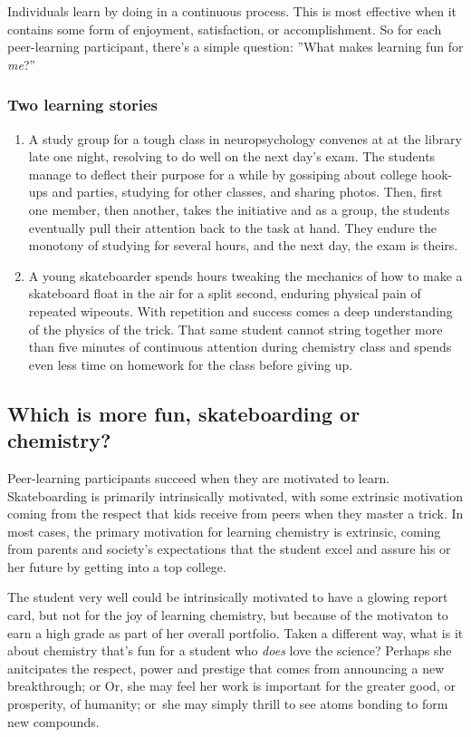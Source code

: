 Individuals learn by doing in a continuous process. This is most
effective when it contains some form of enjoyment, satisfaction, or
accomplishment. So for each peer-learning participant, there's a simple
question: ''What makes learning fun for \emph{me}?''

\subsubsection{Two learning stories}

\begin{enumerate}
\item
  A study group for a tough class in neuropsychology convenes at at the
  library late one night, resolving to do well on the next day's exam.
  The students manage to deflect their purpose for a while by gossiping
  about college hook-ups and parties, studying for other classes, and
  sharing photos. Then, first one member, then another, takes the
  initiative and as a group, the students eventually pull their
  attention back to the task at hand. They endure the monotony of
  studying for several hours, and the next day, the exam is theirs.
\item
  A young skateboarder spends hours tweaking the mechanics of how to
  make a skateboard float in the air for a split second, enduring
  physical pain of repeated wipeouts. With repetition and success comes
  a deep understanding of the physics of the trick. That same student
  cannot string together more than five minutes of continuous attention
  during chemistry class and spends even less time on homework for the
  class before giving up.
\end{enumerate}

\subsection{Which is more fun, skateboarding or chemistry?}

Peer-learning participants succeed when they are motivated to learn.
Skateboarding is primarily intrinsically motivated, with some extrinsic
motivation coming from the respect that kids receive from peers when
they master a trick. In most cases, the primary motivation for learning
chemistry is extrinsic, coming from parents and society's expectations
that the student excel and assure his or her future by getting into a
top college.

The student very well could be intrinsically motivated to have a glowing
report card, but not for the joy of learning chemistry, but because of
the motivaton to earn a high grade as part of her overall portfolio.
Taken a different way, what is it about chemistry that's fun for a
student who \emph{does} love the science? Perhaps she anitcipates the
respect, power and prestige that comes from announcing a new
breakthrough; or Or, she may feel her work is important for the greater
good, or prosperity, of humanity; or~she may simply thrill to see atoms
bonding to form new compounds.

